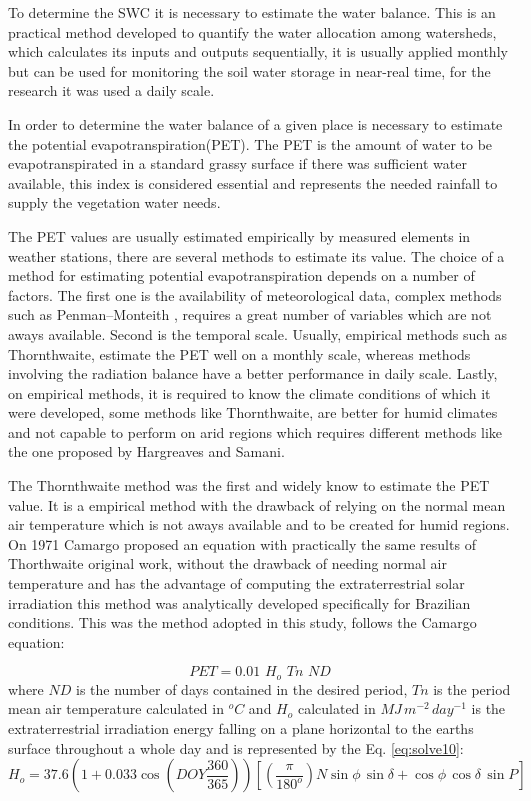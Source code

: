 To determine the SWC it is necessary to estimate the water balance. This is an practical method developed to quantify the water allocation among watersheds, which calculates its inputs and outputs sequentially, it is usually applied monthly but can be used for monitoring the soil water storage in near-real time\cite{thornthwaite1957instructions}, for the research it was used a daily scale.

In order to determine the water balance of a given place is necessary to estimate the potential evapotranspiration(PET). The PET is the amount of water to be evapotranspirated in a standard grassy surface if there was sufficient water available, this index is considered essential and represents the needed rainfall to supply the vegetation water needs\cite{de2000revisao}.

The PET values are usually estimated empirically by measured elements in weather stations, there are several methods to estimate its value. The choice of a method for estimating potential evapotranspiration depends on a number of factors. The first one is the availability of meteorological data, complex methods such as Penman–Monteith \cite{allen1998crop}, requires a great number of variables which are not aways available. Second is the temporal scale. Usually, empirical methods such as Thornthwaite, estimate the PET well on a monthly scale, whereas methods involving the radiation balance have a better performance in daily scale. Lastly, on empirical methods, it is required to know the climate conditions of which it were developed, some methods like Thornthwaite, are better for humid climates and not capable to perform on arid regions which requires different methods like the one proposed by Hargreaves and Samani\cite{hargreaves1985reference}.

The Thornthwaite method \cite{thornthwaite1948approach} was the first and widely know to estimate the PET value. It is a empirical method with the drawback of relying on the normal mean air temperature which is not aways available and to be created for humid regions. On 1971 Camargo\cite{camargo1971paulo} proposed an equation with practically the same results of Thorthwaite original work, without the drawback of needing normal air temperature and has the advantage of computing the extraterrestrial solar irradiation this method was analytically developed specifically for Brazilian conditions. This was the method adopted in this study, follows the Camargo equation:

\begin{equation}
\label{eq:solve9}
PET = 0.01 \,\, H_o \,\, Tn \,\, ND
\end{equation}
where $ND$ is the number of days contained in the desired period, $Tn$ is the period mean air temperature calculated in $^oC$ and $H_o$ calculated in ${MJ} \, m^{-2} \, day^{-1} $ is the extraterrestrial
irradiation energy falling on a plane horizontal to the earths surface throughout a whole day and is represented by the Eq. \ref{eq:solve10}:
\begin{equation}
\label{eq:solve10}
H_o = 37.6(1 + 0.033\cos(DOY\frac{360}{365}))[(\frac{\pi}{180^o}){N} \sin\phi \, \sin\delta + \cos\phi \, \cos\delta \, \sin P]
\end{equation}

